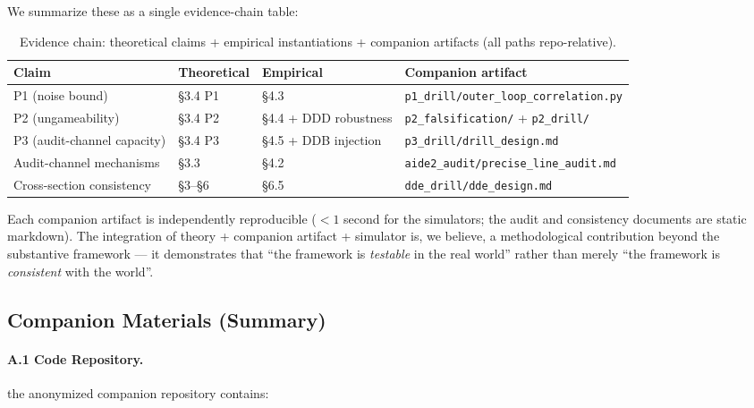 We summarize these as a single evidence-chain table:

\begin{table}[h]
\centering
\caption{Evidence chain: theoretical claims + empirical instantiations + companion artifacts (all paths repo-relative).}
\label{tab:evidence-chain}
\begin{tabular}{llll}
\toprule
Claim & Theoretical & Empirical & Companion artifact \\
\midrule
P1 (noise bound) & \S3.4 P1 & \S4.3 & \texttt{p1\_drill/outer\_loop\_correlation.py} \\
P2 (ungameability) & \S3.4 P2 & \S4.4 + DDD robustness & \texttt{p2\_falsification/} + \texttt{p2\_drill/} \\
P3 (audit-channel capacity) & \S3.4 P3 & \S4.5 + DDB injection & \texttt{p3\_drill/drill\_design.md} \\
Audit-channel mechanisms & \S3.3 & \S4.2 & \texttt{aide2\_audit/precise\_line\_audit.md} \\
Cross-section consistency & \S3--\S6 & \S6.5 & \texttt{dde\_drill/dde\_design.md} \\
\bottomrule
\end{tabular}
\end{table}

Each companion artifact is independently reproducible ($<1$ second for the simulators; the audit and consistency documents are static markdown). The integration of theory + companion artifact + simulator is, we believe, a methodological contribution beyond the substantive framework --- it demonstrates that ``the framework is \emph{testable} in the real world'' rather than merely ``the framework is \emph{consistent} with the world''.

\subsection{Companion Materials (Summary)}

\paragraph{A.1 Code Repository.}
the anonymized companion repository contains:

